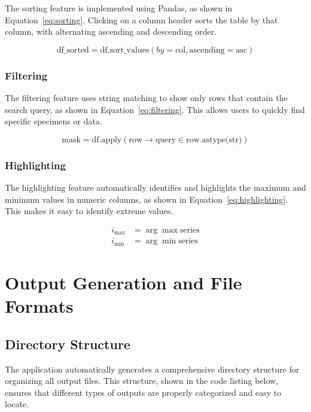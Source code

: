 \documentclass[11pt,a4paper]{article}
\begin{document}
The sorting feature is implemented using Pandas, as shown in Equation~\ref{eq:sorting}. Clicking on a column header sorts the table by that column, with alternating ascending and descending order.

\begin{equation}
\text{df\_sorted} = \text{df.sort\_values}(by=\text{col}, \text{ascending}=\text{asc})
\label{eq:sorting}
\end{equation}

\subsubsection{Filtering}

The filtering feature uses string matching to show only rows that contain the search query, as shown in Equation~\ref{eq:filtering}. This allows users to quickly find specific specimens or data.

\begin{equation}
\text{mask} = \text{df.apply}( \text{row} \rightarrow \text{query} \in \text{row.astype(str)} )
\label{eq:filtering}
\end{equation}

\subsubsection{Highlighting}

The highlighting feature automatically identifies and highlights the maximum and minimum values in numeric columns, as shown in Equation~\ref{eq:highlighting}. This makes it easy to identify extreme values.

\begin{equation}
\begin{aligned}
i_{\max} &= \arg\max \text{series} \\
i_{\min} &= \arg\min \text{series}
\end{aligned}
\label{eq:highlighting}
\end{equation}

\section{Output Generation and File Formats}

\subsection{Directory Structure}

The application automatically generates a comprehensive directory structure for organizing all output files. This structure, shown in the code listing below, ensures that different types of outputs are properly categorized and easy to locate.
\end{document}
